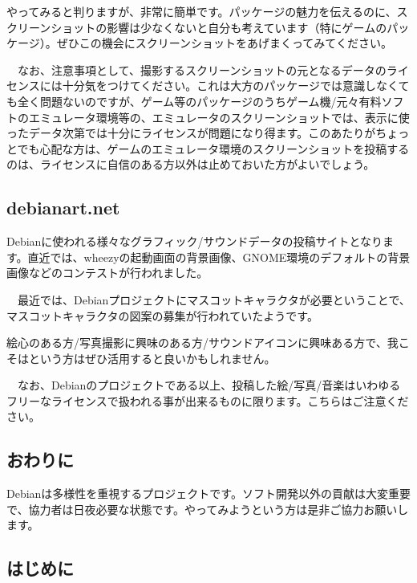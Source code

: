 \documentclass[mingoth,a4paper]{jsarticle}
\begin{document}
やってみると判りますが、非常に簡単です。パッケージの魅力を伝えるのに、スクリーンショットの影響は少なくないと自分も考えています（特にゲームのパッケージ）。ぜひこの機会にスクリーンショットをあげまくってみてください。

　なお、注意事項として、撮影するスクリーンショットの元となるデータのライセンスには十分気をつけてください。これは大方のパッケージでは意識しなくても全く問題ないのですが、ゲーム等のパッケージのうちゲーム機/元々有料ソフトのエミュレータ環境等の、エミュレータのスクリーンショットでは、表示に使ったデータ次第では十分にライセンスが問題になり得ます。このあたりがちょっとでも心配な方は、ゲームのエミュレータ環境のスクリーンショットを投稿するのは、ライセンスに自信のある方以外は止めておいた方がよいでしょう。

\subsection{debianart.net}

 Debianに使われる様々なグラフィック/サウンドデータの投稿サイトとなります。直近では、wheezyの起動画面の背景画像、GNOME環境のデフォルトの背景画像などのコンテストが行われました。

　最近では、Debianプロジェクトにマスコットキャラクタが必要ということで、
マスコットキャラクタの図案の募集が行われていたようです。

 絵心のある方/写真撮影に興味のある方/サウンドアイコンに興味ある方で、我こそはという方はぜひ活用すると良いかもしれません。

　なお、Debianのプロジェクトである以上、投稿した絵/写真/音楽はいわゆるフリーなライセンスで扱われる事が出来るものに限ります。こちらはご注意ください。

\subsection{おわりに}

 Debianは多様性を重視するプロジェクトです。ソフト開発以外の貢献は大変重要で、協力者は日夜必要な状態です。やってみようという方は是非ご協力お願いします。

\subsection{はじめに}
\end{document}
